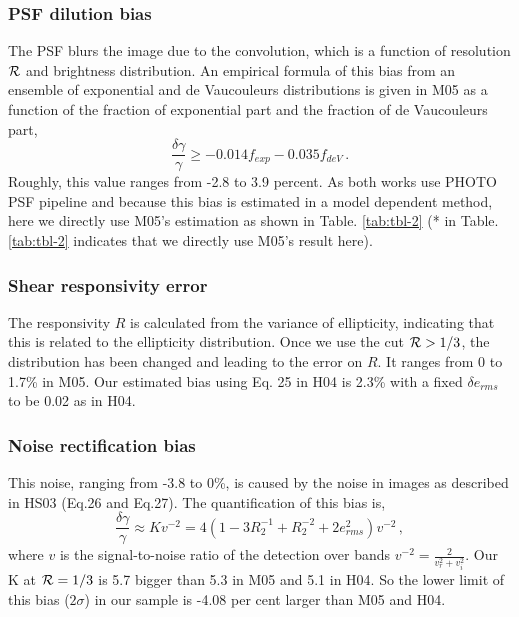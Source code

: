 \documentclass[apj]{emulateapj}
\begin{document}
\subsubsection{PSF dilution bias}

The PSF blurs the image due to the convolution, which is a function of
resolution ${\cal R}$ and brightness distribution.  An empirical
formula of this bias from an ensemble of exponential and de
Vaucouleurs distributions is given in M05 as a function of the fraction
of exponential part and the fraction of de Vaucouleurs part,
\begin{equation}
\frac{\delta\gamma}{\gamma}\geq -0.014f_{exp}-0.035f_{deV}\,.
\end{equation}
Roughly, this value ranges from -2.8 to 3.9 percent. As both works use
PHOTO PSF pipeline and because this bias is estimated in a model
dependent method, here we directly use M05's estimation as shown in
Table. \ref{tab:tbl-2} (* in Table. \ref{tab:tbl-2} indicates that we
directly use M05's result here).

\subsubsection{Shear responsivity error}

The responsivity $\textit{R}$ is calculated from the variance of
ellipticity, indicating that this is related to the ellipticity
distribution. Once we use the cut ${\cal R}>1/3$, the distribution has
been changed and leading to the error on $\textit{R}$. It ranges from
0 to 1.7\% in M05.  Our estimated bias using Eq. 25 in H04 is 2.3\%
with a fixed $\delta e_{rms}$ to be 0.02 as in H04.

\subsubsection{Noise rectification bias}

This noise, ranging from -3.8 to 0\%, is caused by the noise in images
as described in HS03 (Eq.26 and Eq.27). The quantification of this
bias is,
\begin{equation}
\frac{\delta\gamma}{\gamma}\approx Kv^{-2}=
4(1-3R_2^{-1}+R_2^{-2}+2e_{rms}^2)v^{-2}\,,
\end{equation}
where $v$ is the signal-to-noise ratio of the detection over bands
$v^{-2}=\frac{2}{v_r^2+v_i^2}$. Our K at ${\cal R}=1/3$ is 5.7 bigger
than 5.3 in M05 and 5.1 in H04. So the
lower limit of this bias ($2\sigma$) in our sample is -4.08 per cent
larger than M05 and H04.
\end{document}
